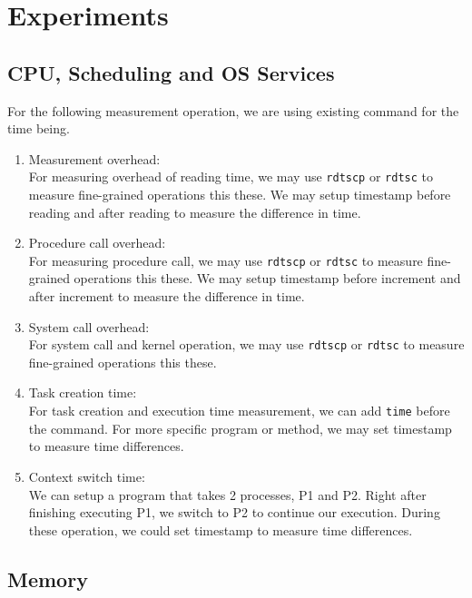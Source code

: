 \section{Experiments}


\subsection{CPU, Scheduling and OS Services}
For the following measurement operation, we are using existing command for the time being.
\begin{enumerate}
	\item Measurement overhead:\\
	For measuring overhead of reading time, we may use \texttt{rdtscp} or \texttt{rdtsc} to measure fine-grained operations this these.
	We may setup timestamp before reading and after reading to measure the difference in time.
	\item Procedure call overhead:\\
	For measuring procedure call, we may use \texttt{rdtscp} or \texttt{rdtsc} to measure fine-grained operations this these.
	We may setup timestamp before increment and after increment to measure the difference in time.
	\item System call overhead:\\
	For system call and kernel operation, we may use \texttt{rdtscp} or \texttt{rdtsc} to measure fine-grained operations this these.
	\item Task creation time:\\
	For task creation and execution time measurement, we can add \texttt{time} before the command. For more specific program or method, we may set timestamp to measure time differences.
	
	\item Context switch time:\\
	We can setup a program that takes 2 processes, P1 and P2. Right after finishing executing P1, we switch to P2 to continue our execution. During these operation, we could set timestamp to measure time differences.
\end{enumerate}

\subsection{Memory}
